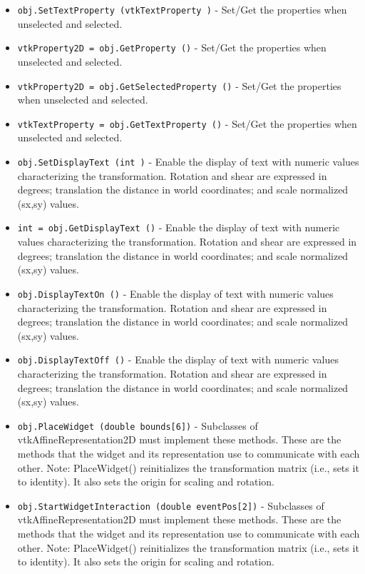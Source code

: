 \begin{itemize}
\item  \verb|obj.SetTextProperty (vtkTextProperty )| -  Set/Get the properties when unselected and selected.

\item  \verb|vtkProperty2D = obj.GetProperty ()| -  Set/Get the properties when unselected and selected.

\item  \verb|vtkProperty2D = obj.GetSelectedProperty ()| -  Set/Get the properties when unselected and selected.

\item  \verb|vtkTextProperty = obj.GetTextProperty ()| -  Set/Get the properties when unselected and selected.

\item  \verb|obj.SetDisplayText (int )| -  Enable the display of text with numeric values characterizing the 
 transformation. Rotation and shear are expressed in degrees; translation
 the distance in world coordinates; and scale normalized (sx,sy) values.

\item  \verb|int = obj.GetDisplayText ()| -  Enable the display of text with numeric values characterizing the 
 transformation. Rotation and shear are expressed in degrees; translation
 the distance in world coordinates; and scale normalized (sx,sy) values.

\item  \verb|obj.DisplayTextOn ()| -  Enable the display of text with numeric values characterizing the 
 transformation. Rotation and shear are expressed in degrees; translation
 the distance in world coordinates; and scale normalized (sx,sy) values.

\item  \verb|obj.DisplayTextOff ()| -  Enable the display of text with numeric values characterizing the 
 transformation. Rotation and shear are expressed in degrees; translation
 the distance in world coordinates; and scale normalized (sx,sy) values.

\item  \verb|obj.PlaceWidget (double bounds[6])| -  Subclasses of vtkAffineRepresentation2D must implement these methods. These
 are the methods that the widget and its representation use to
 communicate with each other. Note: PlaceWidget() reinitializes the 
 transformation matrix (i.e., sets it to identity). It also sets the
 origin for scaling and rotation.

\item  \verb|obj.StartWidgetInteraction (double eventPos[2])| -  Subclasses of vtkAffineRepresentation2D must implement these methods. These
 are the methods that the widget and its representation use to
 communicate with each other. Note: PlaceWidget() reinitializes the 
 transformation matrix (i.e., sets it to identity). It also sets the
 origin for scaling and rotation.


\end{itemize}
